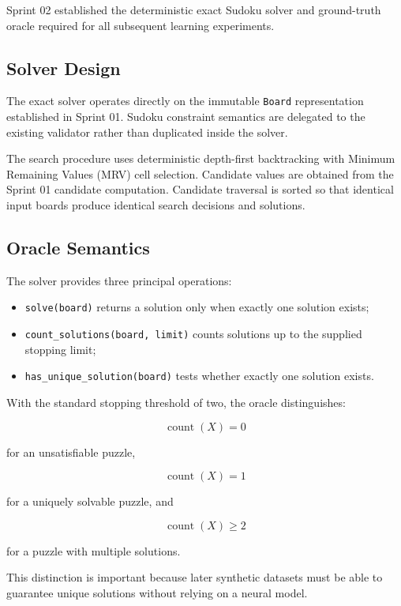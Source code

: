 \documentclass[11pt,a4paper]{article}
\begin{document}
Sprint 02 established the deterministic exact Sudoku solver and
ground-truth oracle required for all subsequent learning experiments.

\subsection{Solver Design}

The exact solver operates directly on the immutable \texttt{Board}
representation established in Sprint 01. Sudoku constraint semantics are
delegated to the existing validator rather than duplicated inside the
solver.

The search procedure uses deterministic depth-first backtracking with
Minimum Remaining Values (MRV) cell selection. Candidate values are
obtained from the Sprint 01 candidate computation. Candidate traversal is
sorted so that identical input boards produce identical search decisions
and solutions.

\subsection{Oracle Semantics}

The solver provides three principal operations:

\begin{itemize}
    \item \texttt{solve(board)} returns a solution only when exactly one
    solution exists;
    \item \texttt{count\_solutions(board, limit)} counts solutions up to
    the supplied stopping limit;
    \item \texttt{has\_unique\_solution(board)} tests whether exactly one
    solution exists.
\end{itemize}

With the standard stopping threshold of two, the oracle distinguishes:

\[
\operatorname{count}(X)=0
\]

for an unsatisfiable puzzle,

\[
\operatorname{count}(X)=1
\]

for a uniquely solvable puzzle, and

\[
\operatorname{count}(X)\geq2
\]

for a puzzle with multiple solutions.

This distinction is important because later synthetic datasets must be
able to guarantee unique solutions without relying on a neural model.
\end{document}
